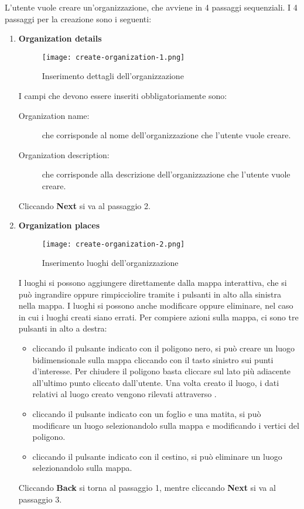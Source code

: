 \documentclass[../manuale-utente.tex]{subfiles}
\begin{document}
L'utente vuole creare un'organizzazione, che avviene in 4 passaggi sequenziali.
I 4 passaggi per la creazione sono i seguenti:
\begin{enumerate}
    \item \textbf{Organization details}

    \begin{figure}[H]
      \centering
      \texttt{[image: create-organization-1.png]}
      \caption{Inserimento dettagli dell'organizzazione}%
      \label{fig:web_app_inserimento_dettagli_organizzazione}
    \end{figure}
    I campi che devono essere inseriti obbligatoriamente sono:
    \begin{description}
      \item[Organization name:] che corrisponde al nome dell'organizzazione che l'utente vuole creare.
      \item[Organization description:] che corrisponde alla descrizione dell'organizzazione che l'utente vuole creare.
    \end{description}
    Cliccando \textbf{Next} si va al passaggio 2.

    \item \textbf{Organization places}

    \begin{figure}[H]
      \centering
      \texttt{[image: create-organization-2.png]}
      \caption{Inserimento luoghi dell'organizzazione}%
      \label{fig:web_app_inserimento_luoghi_organizzazione}
    \end{figure}
    I luoghi si possono aggiungere direttamente dalla mappa interattiva, che si può ingrandire oppure rimpicciolire tramite i pulsanti in alto alla sinistra nella mappa.
    I luoghi si possono anche modificare oppure eliminare, nel caso in cui i luoghi creati siano errati.
    Per compiere azioni sulla mappa, ci sono tre pulsanti in alto a destra:
    \begin{itemize}
        \item cliccando il pulsante indicato con il poligono nero, si può creare un luogo bidimensionale sulla mappa cliccando con il tasto sinistro sui punti d'interesse. Per chiudere il poligono basta cliccare sul lato più adiacente all'ultimo punto cliccato dall'utente. Una volta creato il luogo, i dati relativi al luogo creato vengono rilevati attraverso .
        \item cliccando il pulsante indicato con un foglio e una matita, si può modificare un luogo selezionandolo sulla mappa e modificando i vertici del poligono.
        \item cliccando il pulsante indicato con il cestino, si può eliminare un luogo selezionandolo sulla mappa.
    \end{itemize}
    Cliccando \textbf{Back} si torna al passaggio 1, mentre cliccando \textbf{Next} si va al passaggio 3.


\end{enumerate}
\end{document}
